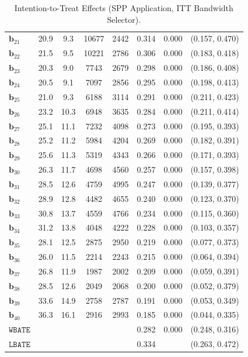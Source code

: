 \documentclass[10pt]{article}
\newcommand{\bb}{\mathbf{b}}
\begin{document}
\begin{table}[p]
\begin{tabular}{lccccccc}
   $\bb_{21}$ & 20.9 & 9.3 & 10677 & 2442 & 0.314 & 0.000 & (0.157, 0.470)\\
   $\bb_{22}$ & 21.5 & 9.5 & 10221 & 2786 & 0.306 & 0.000 & (0.183, 0.418)\\
   $\bb_{23}$ & 20.3 & 9.0 & 7743 & 2679 & 0.298 & 0.000 & (0.186, 0.408)\\
   $\bb_{24}$ & 20.5 & 9.1 & 7097 & 2856 & 0.295 & 0.000 & (0.198, 0.413)\\
   $\bb_{25}$ & 21.0 & 9.3 & 6188 & 3114 & 0.291 & 0.000 & (0.211, 0.423)\\
   $\bb_{26}$ & 23.2 & 10.3 & 6948 & 3635 & 0.284 & 0.000 & (0.211, 0.414)\\
   $\bb_{27}$ & 25.1 & 11.1 & 7232 & 4098 & 0.273 & 0.000 & (0.195, 0.393)\\
   $\bb_{28}$ & 25.2 & 11.2 & 5984 & 4204 & 0.269 & 0.000 & (0.182, 0.391)\\
   $\bb_{29}$ & 25.6 & 11.3 & 5319 & 4343 & 0.266 & 0.000 & (0.171, 0.393)\\
   $\bb_{30}$ & 26.3 & 11.7 & 4698 & 4560 & 0.257 & 0.000 & (0.157, 0.398)\\
   $\bb_{31}$ & 28.5 & 12.6 & 4759 & 4995 & 0.247 & 0.000 & (0.139, 0.377)\\
   $\bb_{32}$ & 28.9 & 12.8 & 4482 & 4655 & 0.240 & 0.000 & (0.123, 0.370)\\
   $\bb_{33}$ & 30.8 & 13.7 & 4559 & 4766 & 0.234 & 0.000 & (0.115, 0.360)\\
   $\bb_{34}$ & 31.2 & 13.8 & 4048 & 4222 & 0.228 & 0.000 & (0.103, 0.357)\\
   $\bb_{35}$ & 28.1 & 12.5 & 2875 & 2950 & 0.219 & 0.000 & (0.077, 0.373)\\
   $\bb_{36}$ & 26.0 & 11.5 & 2214 & 2243 & 0.215 & 0.000 & (0.064, 0.394)\\
   $\bb_{37}$ & 26.8 & 11.9 & 1987 & 2002 & 0.209 & 0.000 & (0.059, 0.391)\\
   $\bb_{38}$ & 28.5 & 12.6 & 2049 & 2068 & 0.200 & 0.000 & (0.052, 0.379)\\
   $\bb_{39}$ & 33.6 & 14.9 & 2758 & 2787 & 0.191 & 0.000 & (0.053, 0.349)\\
   $\bb_{40}$ & 36.3 & 16.1 & 2916 & 2993 & 0.185 & 0.000 & (0.044, 0.335)\\
  \midrule
   $\mathtt{WBATE}$ &  &  &  &  & 0.282 & 0.000 & (0.248, 0.316)\\
  \midrule
   $\mathtt{LBATE}$ &  &  &  &  & 0.334 &  & (0.263, 0.472)\\
  \bottomrule\bottomrule
\end{tabular}

    \caption{Intention-to-Treat Effects (SPP Application, ITT Bandwidth Selector).}
    \label{tab:sa-empapp_main_itt}
\end{table}
\end{document}
